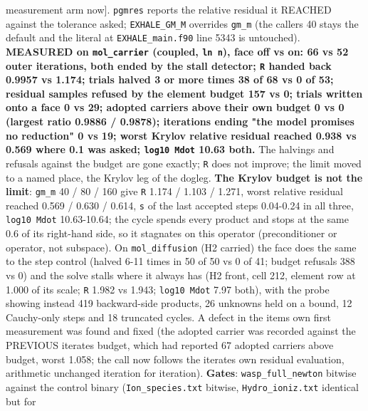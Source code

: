 \documentclass[english,a4paper]{my_memo}
\begin{document}
\begin{itemize}
  measurement arm now{]}. \texttt{pgmres} reports the
  relative residual it REACHED against the tolerance asked; \texttt{EXHALE\_GM\_M}
  overrides \texttt{gm\_m} (the caller\textquotesingle s 40 stays the default and the literal at
  \texttt{EXHALE\_main.f90} line 5343 is untouched). \textbf{MEASURED on \texttt{mol\_carrier}
  (coupled, \texttt{ln\ n}), face off vs on: 66 vs 52 outer iterations, both ended
  by the stall detector; \texttt{\textbar{}\textbar{}R\textbar{}\textbar{}} handed back 0.9957 vs 1.174; trials halved
  3 or more times 38 of 68 vs 0 of 53; residual samples refused by the
  element budget 157 vs 0; trials written onto a face 0 vs 29; adopted
  carriers above their own budget 0 vs 0 (largest ratio 0.9886 / 0.9878);
  iterations ending "the model promises no reduction" 0 vs 19; worst Krylov
  relative residual reached 0.938 vs 0.569 where 0.1 was asked; \texttt{log10\ Mdot} 10.63 both.} The halvings and refusals against the budget are gone
  exactly; \texttt{\textbar{}\textbar{}R\textbar{}\textbar{}} does not improve; the limit moved to a named place, the
  Krylov leg of the dogleg. \textbf{The Krylov budget is not the limit}: \texttt{gm\_m}
  40 / 80 / 160 give \texttt{\textbar{}\textbar{}R\textbar{}\textbar{}} 1.174 / 1.103 / 1.271, worst relative residual
  reached 0.569 / 0.630 / 0.614, \texttt{\textbar{}\textbar{}s\textbar{}\textbar{}} of the last accepted steps
  0.04-0.24 in all three, \texttt{log10\ Mdot} 10.63-10.64; the cycle spends every
  product and stops at the same 0.6 of its right-hand side, so it stagnates
  on this operator (preconditioner or operator, not subspace). On
  \texttt{mol\_diffusion} (H2 carried) the face does the same to the step control
  (halved 6-11 times in 50 of 50 vs 0 of 41; budget refusals 388 vs 0) and
  the solve stalls where it always has (H2 front, cell 212, element row at
  1.000 of its scale; \texttt{\textbar{}\textbar{}R\textbar{}\textbar{}} 1.982 vs 1.943; \texttt{log10\ Mdot} 7.97 both), with
  the probe showing instead 419 backward-side products, 26 unknowns held on
  a bound, 12 Cauchy-only steps and 18 truncated cycles. A defect in the
  item\textquotesingle s own first measurement was found and fixed (the adopted carrier
  was recorded against the PREVIOUS iterate\textquotesingle s budget, which had reported 67
  adopted carriers above budget, worst 1.058; the call now follows the
  iterate\textquotesingle s own residual evaluation, arithmetic unchanged iteration for
  iteration). \textbf{Gates}: \texttt{wasp\_full\_newton} bitwise against the control
  binary (\texttt{Ion\_species.txt} bitwise, \texttt{Hydro\_ioniz.txt} identical but for

\end{itemize}
\end{document}
